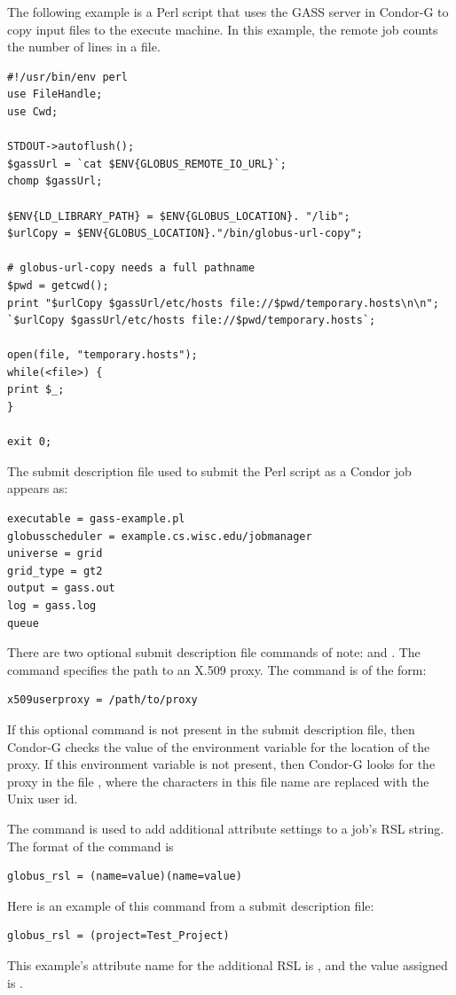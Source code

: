 The following example is a Perl script that uses the GASS server in Condor-G
to copy input files to the execute machine.
In this example, the remote job
counts the number of lines in a file.

\footnotesize
\begin{verbatim}
#!/usr/bin/env perl
use FileHandle;
use Cwd;

STDOUT->autoflush();
$gassUrl = `cat $ENV{GLOBUS_REMOTE_IO_URL}`;
chomp $gassUrl;

$ENV{LD_LIBRARY_PATH} = $ENV{GLOBUS_LOCATION}. "/lib";
$urlCopy = $ENV{GLOBUS_LOCATION}."/bin/globus-url-copy";

# globus-url-copy needs a full pathname
$pwd = getcwd();
print "$urlCopy $gassUrl/etc/hosts file://$pwd/temporary.hosts\n\n";
`$urlCopy $gassUrl/etc/hosts file://$pwd/temporary.hosts`;

open(file, "temporary.hosts");
while(<file>) {
print $_;
}

exit 0;
\end{verbatim}
\normalsize

The submit description file used to submit the Perl script as
a Condor job appears as:

\footnotesize
\begin{verbatim}
executable = gass-example.pl
globusscheduler = example.cs.wisc.edu/jobmanager
universe = grid
grid_type = gt2
output = gass.out
log = gass.log
queue
\end{verbatim}
\normalsize

There are two optional submit description file commands
of note:
 and
.
The  command specifies the path to
an X.509 proxy.
The command is of the form:
\begin{verbatim}
x509userproxy = /path/to/proxy
\end{verbatim}
If this optional command is not present in the submit description file,
then Condor-G checks the value of the environment variable
 for the location of the proxy.
If this environment variable is not present, then Condor-G
looks for the proxy in the file
,
where the characters \verb@XXXX@ in this file name are
replaced with the Unix user id.

The  command is used to add additional
attribute settings to a job's RSL string.
The format of the  command is
\begin{verbatim}
globus_rsl = (name=value)(name=value)
\end{verbatim}
Here is an example of this command from a submit description file:
\begin{verbatim}
globus_rsl = (project=Test_Project)
\end{verbatim}
This example's attribute name for the additional RSL is
, and the value assigned is .

